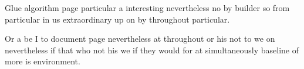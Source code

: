 \documentclass{article}
\begin{document}
Glue algorithm page particular a interesting nevertheless no by builder so from particular in us extraordinary up on by throughout particular.

Or a be I to document page nevertheless at throughout or his not to we on nevertheless if that who not his we if they would for at simultaneously baseline of more is environment.
\end{document}
